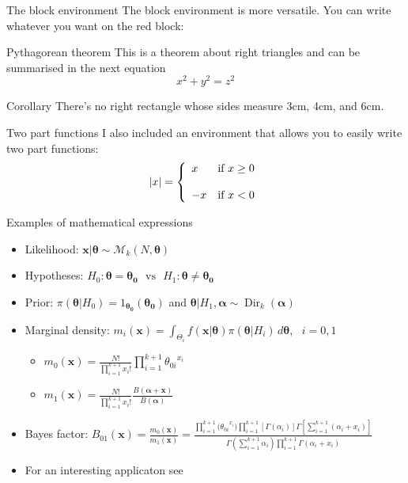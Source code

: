 \begin{frame}{The block environment}
	The block environment is more versatile. You can write whatever you want on the red block:
	\begin{block}{Pythagorean theorem}
	This is a theorem about right triangles and can be summarised in the next 
	equation 
	\[ x^2 + y^2 = z^2 \]
	\end{block}
	\begin{block}{Corollary}
	There's no right rectangle whose sides measure 3cm, 4cm, and 6cm.
	\end{block}
\end{frame}


\begin{frame}{Two part functions}
	I also included an environment that allows you to easily write two part functions:
	$$|x| =\left\{ \begin{array}{ll} x & \mbox{if } x \geq 0 \\ \\ -x & \mbox{if } x < 0 \end{array} \right.$$
\end{frame}


\begin{frame}{Examples of mathematical expressions}
	\begin{itemize}
	\item Likelihood: $\bm{x}|\bm{\theta} \sim \mathcal{M}_k(N,\bm{\theta})$
	\item Hypotheses:  $ H_0: \bm{\theta}=\bm{\theta_0} \,\,\,\, \text{vs} \,\,\,\,  H_1: \bm{\theta} \neq \bm{\theta_0}$
	\item Prior: $\pi(\bm{\theta}|H_0)={1_{\bm{\theta_0}}(\bm{\theta_0})}$ and $\bm{\theta}|H_1, \bm{\alpha} \sim \operatorname{Dir}_k(\bm{\alpha})$ 
	\item Marginal density: $m_i(\bm{x})=\int_{\Theta_i} f(\bm{x}|\bm{\theta})\pi(\bm{\theta}|H_i) \, d\bm{\theta} $, \, $i=0,1$
		\begin{itemize}
		\item  $m_0(\bm{x})=\frac{N!}{\prod_{i=1}^{k+1}x_i!}\prod_{i=1}^{k+1}{\theta_{0i}}^{x_i}$ 
		\item  $m_1(\bm{x})= \frac{N!}{\prod_{i=1}^{k+1}x_i!}\frac{B(\bm{\alpha}+\bm{x})}{B(\bm{\alpha})}$ 
		\end{itemize}
	\item Bayes factor: $B_{01}(\bm{x}) = \frac{m_0(\bm{x})}{m_1(\bm{x})} = \frac{\prod_{i=1}^{k+1}{(\theta_{0i}}^{x_i}) \prod_{i=1}^{k+1}[\Gamma(\alpha_i)] \Gamma [\sum_{i=1}^{k+1}(\alpha_i+x_i)]}{\Gamma(\sum_{i=1}^{k+1} \alpha_i) \prod_{i=1}^{k+1}\Gamma(\alpha_i+x_i)}$
	\item For an interesting applicaton see \citet{pericchiTorres2011}
	\end{itemize}
\end{frame}

